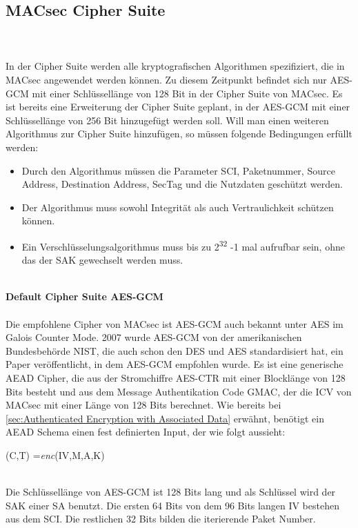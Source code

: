 \subsection{MACsec Cipher Suite}\\
\\ 
In der Cipher Suite werden alle kryptografischen Algorithmen spezifiziert, die in MACsec angewendet werden können. Zu diesem Zeitpunkt befindet sich nur \gls{AES-GCM} mit einer Schlüssellänge von 128 Bit in der Cipher Suite von \gls{MACsec}. Es ist bereits eine Erweiterung der Cipher Suite geplant, in der AES-GCM mit einer Schlüssellänge von 256 Bit hinzugefügt werden soll\cite{6047536}.
Will man einen weiteren Algorithmus zur Cipher Suite hinzufügen, so müssen folgende Bedingungen erfüllt werden:
\begin{itemize}
\item Durch den Algorithmus müssen die Parameter \gls{SCI}, Paketnummer, Source Address, Destination Address, SecTag und die Nutzdaten geschützt werden. 
\item Der Algorithmus muss sowohl Integrität als auch Vertraulichkeit schützen können. 
\item Ein Verschlüsselungsalgorithmus muss bis zu 2\textsuperscript{32} -1 mal aufrufbar sein, ohne das der \gls{SAK} gewechselt werden muss.
\end{itemize} \\
\textbf{Default Cipher Suite AES-GCM}\\
\\
Die empfohlene Cipher von MACsec ist \gls{AES-GCM} auch bekannt unter \gls{AES} im Galois Counter Mode.  %
2007 wurde AES-GCM von der amerikanischen Bundesbehörde \gls{NIST}, die auch schon den \gls{DES} und AES standardisiert hat, ein Paper veröffentlicht, in dem AES-GCM empfohlen wurde.
Es ist eine generische \gls{AEAD} Cipher, die aus der Stromchiffre AES-CTR mit einer Blocklänge von 128 Bits besteht und aus dem Message Authentikation Code GMAC, der die \gls{ICV} von MACsec mit einer Länge von 128 Bits berechnet. Wie bereits bei \ref{sec:Authenticated Encryption with Associated Data} erwähnt, benötigt ein \gls{AEAD} Schema einen fest definierten Input, der wie folgt aussieht:\\\centerline{(C,T) =\textit{enc}(IV,M,A,K)}\\
Die Schlüssellänge von \gls{AES-GCM} ist 128 Bits lang und als Schlüssel wird der \gls{SAK} einer \gls{SA} benutzt. Die ersten 64 Bits von dem 96 Bits langen \gls{IV} bestehen aus dem SCI. Die restlichen 32 Bits bilden die iterierende Paket Number.
